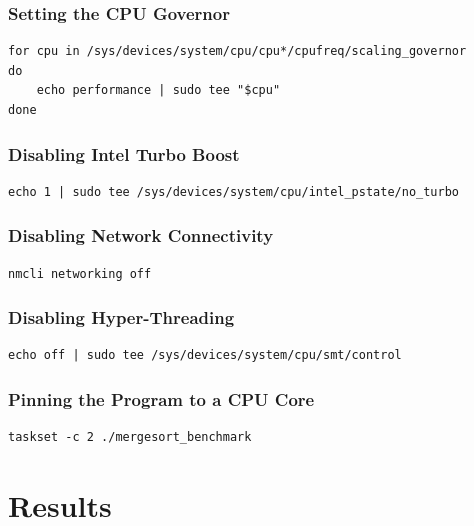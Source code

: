 \documentclass{article}
\begin{document}
\subsubsection*{Setting the CPU Governor}

\begin{verbatim}
for cpu in /sys/devices/system/cpu/cpu*/cpufreq/scaling_governor
do
    echo performance | sudo tee "$cpu"
done
\end{verbatim}

\subsubsection*{Disabling Intel Turbo Boost}

\begin{verbatim}
echo 1 | sudo tee /sys/devices/system/cpu/intel_pstate/no_turbo
\end{verbatim}

\subsubsection*{Disabling Network Connectivity}

\begin{verbatim}
nmcli networking off
\end{verbatim}

\subsubsection*{Disabling Hyper-Threading}

\begin{verbatim}
echo off | sudo tee /sys/devices/system/cpu/smt/control
\end{verbatim}

\subsubsection*{Pinning the Program to a CPU Core}

\begin{verbatim}
taskset -c 2 ./mergesort_benchmark
\end{verbatim}

\section{Results}
\end{document}
